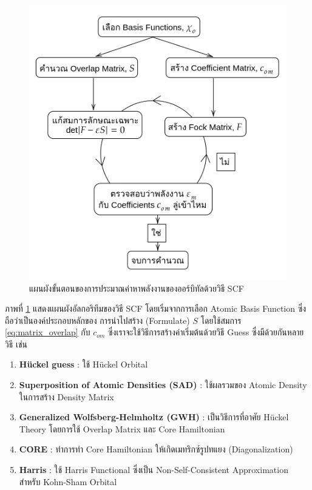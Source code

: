 \begin{figure}[H]
    \centering
    \includegraphics[width=0.9\linewidth]{fig/scf.png}
    \caption{แผนผังขั้นตอนของการประมาณค่าหาพลังงานของออร์บิทัลด้วยวิธี SCF}
    \label{fig:scf}
\end{figure}

ภาพที่ \ref{fig:scf} แสดงแผนผังอัลกอริทึมของวิธี SCF โดยเริ่มจากการเลือก Atomic Basis Function ซึ่งถือว่าเป็นองค์ประกอบหลักของ%
การนำไปสร้าง (Formulate) $S$ โดยใช้สมการ \eqref{eq:matrix_overlap} กับ $c_{om}$ ซึ่งเราจะใช้วิธีการสร้างค่าเริ่มต้นด้วยวิธี Guess
ซึ่งมีด้วยกันหลายวิธี เช่น
%
\begin{enumerate}[topsep=0pt,noitemsep]\setlength\itemsep{0.5em}
    \item \textbf{H{\"u}ckel guess} : ใช้ H{\"u}ckel Orbital\autocite{jensen2017}

    \item \textbf{Superposition of Atomic Densities (SAD)} : ใช้ผลรวมของ Atomic Density ในการสร้าง Density Matrix

    \item \textbf{Generalized Wolfsberg-Helmholtz (GWH)} : เป็นวิธีการที่อาศัย H{\"u}ckel Theory โดยการใช้ Overlap
          Matrix และ Core Hamiltonian\autocite{wolfsberg1952}

    \item \textbf{CORE} : ทำการทำ Core Hamiltonian ให้เกิดเมทริกซ์รูปทแยง (Diagonalization)

    \item \textbf{Harris} : ใช้ Harris Functional ซึ่งเป็น Non-Self-Consistent Approximation สำหรับ Kohn-Sham
          Orbital\autocite{harris1985}
\end{enumerate}

